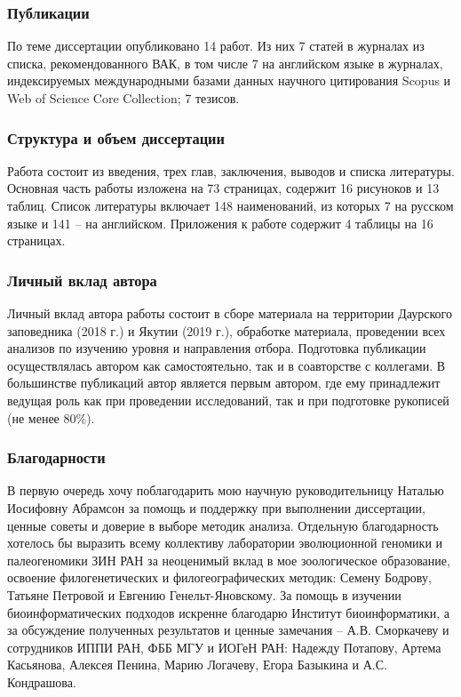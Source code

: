 \subsubsection*{Публикации}

По теме диссертации опубликовано 14 работ. Из них 7 статей в журналах из списка, рекомендованного ВАК, в том числе 7 на английском языке в журналах, индексируемых международными базами данных научного цитирования Scopus и Web of Science Core Collection; 7 тезисов.


\subsubsection*{Структура и объем диссертации}

Работа состоит из введения, трех глав, заключения, выводов и списка литературы. Основная часть работы изложена на 73 страницах, содержит 16 рисуноков и 13 таблиц. Список литературы включает 148 наименований, из которых 7 на русском языке и 141 -- на английском. Приложения к работе содержит 4 таблицы на 16 страницах.

\subsubsection*{Личный вклад автора}

Личный вклад автора работы состоит в сборе материала на территории Даурского заповедника (2018 г.) и Якутии (2019 г.), обработке материала, проведении всех анализов по изучению уровня и направления отбора. Подготовка публикации осуществлялась автором как самостоятельно, так и в соавторстве с коллегами. В большинстве публикаций автор является первым автором, где ему принадлежит ведущая роль как при проведении исследований, так и при подготовке рукописей (не менее 80\%).

\subsubsection*{Благодарности}

В первую очередь хочу поблагодарить мою научную руководительницу Наталью Иосифовну Абрамсон за помощь и поддержку при выполнении диссертации, ценные советы и доверие в выборе методик анализа. Отдельную благодарность хотелось бы выразить всему коллективу лаборатории эволюционной геномики и палеогеномики ЗИН РАН за неоценимый вклад в мое зоологическое образование, освоение филогенетических и филогеографических методик: Семену Бодрову, Татьяне Петровой и Евгению Генельт-Яновскому. За помощь в изучении биоинформатических подходов искренне благодарю Институт биоинформатики, а за обсуждение полученных результатов и ценные замечания -- А.В. Сморкачеву и сотрудников ИППИ РАН, ФББ МГУ и ИОГеН РАН: Надежду Потапову, Артема Касьянова, Алексея Пенина, Марию Логачеву, Егора Базыкина и А.С. Кондрашова.   

